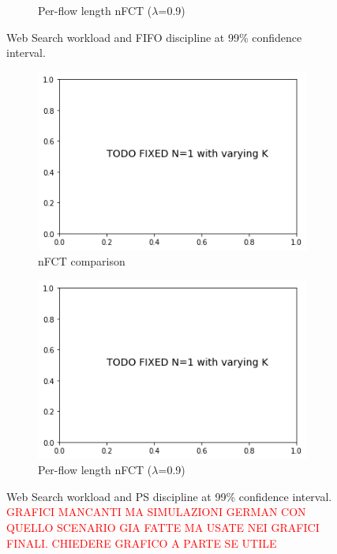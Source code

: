 \begin{figure}
\begin{subfigure}{.5\textwidth}
		\caption{Per-flow length nFCT ($\lambda$=0.9)}
		\label{fig:lb-var-K-fifo-detailed}
	\end{subfigure}
	\caption{Web Search workload and FIFO discipline at 99\% confidence interval.}
	\label{fig:lb-var-K-fifo}
\end{figure}
\begin{figure}
	\centering
	\begin{subfigure}{.5\textwidth}
		\centering
		\includegraphics[width=0.99\textwidth]{Chapter3/Figures/todo}
		\caption{nFCT comparison}
	\end{subfigure}%
	\hfill
	\begin{subfigure}{.5\textwidth}
		\centering
		\includegraphics[width=0.99\textwidth]{Chapter3/Figures/todo}
		\caption{Per-flow length nFCT ($\lambda$=0.9)}
		\label{fig:lb-var-K-ps-detailed}
	\end{subfigure}
	\caption{Web Search workload and PS discipline at 99\% confidence interval. \textcolor{red}{GRAFICI MANCANTI MA SIMULAZIONI GERMAN CON QUELLO SCENARIO GIA FATTE MA USATE NEI GRAFICI FINALI. CHIEDERE GRAFICO A PARTE SE UTILE}}
	\label{fig:lb-var-K-ps}
\end{figure}
